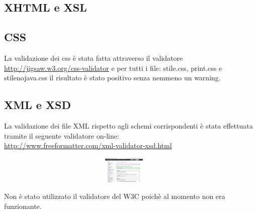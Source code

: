 \subsection{XHTML e XSL}
	
\subsection{CSS}
La validazione dei css \`e stata fatta attraverso il validatore 
\href{http://jigsaw.w3.org/css-validator}{http://jigsaw.w3.org/css-validator}
e per tutti i file: stile.css, print.css e stilenojava.css il risultato \`e stato positivo senza nemmeno un warning.
 
\subsection{XML e XSD}
La validazione dei file XML rispetto agli schemi corrispondenti \`e stata effettuata tramite il seguente validatore on-line:
\\
\href{http://www.freeformatter.com/xml-validator-xsd.html}{http://www.freeformatter.com/xml-validator-xsd.html}
\begin{figure}[htbp]
	\centering
	\includegraphics[width=105mm, height=13mm]{images/validazioneArticoli.png}
\end{figure}
Non è stato utilizzato il validatore del W3C poich\`e al momento non era funzionante.
